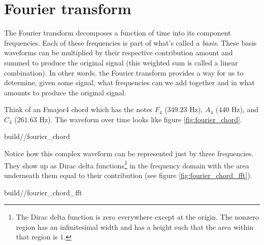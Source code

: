 \section{Fourier transform}

The Fourier transform decomposes a function of time into its component
frequencies. Each of these frequencies is part of what's called a
\textit{basis}. These basis waveforms can be multiplied by their respective
contribution amount and summed to produce the original signal (this weighted sum
is called a linear combination). In other words, the Fourier transform provides
a way for us to determine, given some signal, what frequencies can we add
together and in what amounts to produce the original signal.

Think of an Fmajor4 chord which has the notes $F_4$ ($349.23$ Hz), $A_4$ ($440$
Hz), and $C_4$ ($261.63$ Hz). The waveform over time looks like figure
\ref{fig:fourier_chord}.
\begin{svg}{build/\chapterpath/fourier_chord}
  \caption{Frequency decomposition of Fmajor4 chord}
  \label{fig:fourier_chord}
\end{svg}

Notice how this complex waveform can be represented just by three frequencies.
They show up as Dirac delta functions\footnote{The Dirac delta function is zero
everywhere except at the origin. The nonzero region has an infinitesimal width
and has a height such that the area within that region is $1$.} in the frequency
domain with the area underneath them equal to their contribution (see figure
\ref{fig:fourier_chord_fft}).
\begin{svg}{build/\chapterpath/fourier_chord_fft}
  \caption{Fourier transform of Fmajor4 chord}
  \label{fig:fourier_chord_fft}
\end{svg}
